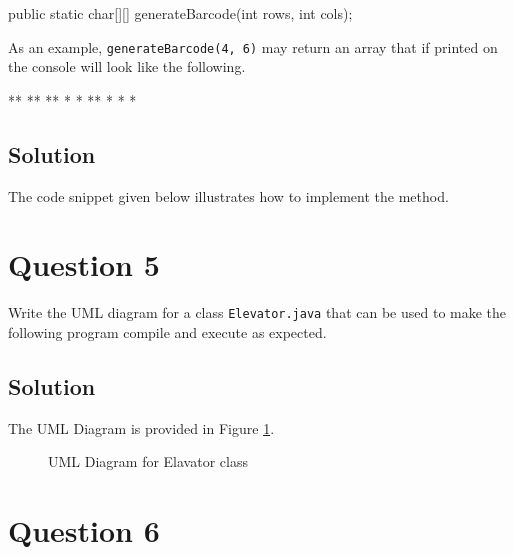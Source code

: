 \documentclass[12pt,letterpaper,twoside]{article}
\begin{document}
\begin{terminal}
public static char[][] generateBarcode(int rows, int cols);
\end{terminal}

As an example, \texttt{generateBarcode(4, 6)} may return an array that if printed on the console will look like the following.

\begin{terminal}
 ** **
** *
* ** *
 *  *
\end{terminal}

\subsection*{Solution}

The code snippet given below illustrates how to implement the method.



\section*{Question 5}

Write the UML diagram for a class \texttt{Elevator.java} that can be used to make the following program compile and execute as expected.



\subsection*{Solution}

The UML Diagram is provided in Figure \ref{figQ5}.

\begin{figure}[H]
	\centering
	\caption{UML Diagram for Elavator class}\label{figQ5}
\end{figure}

\newpage

\section*{Question 6}
\end{document}
